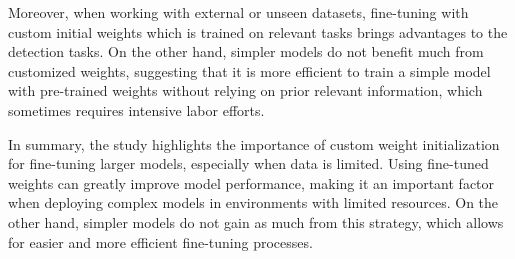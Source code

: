 Moreover, when working with external or unseen datasets, fine-tuning with custom initial weights which is trained on relevant tasks brings advantages to the detection tasks.  On the other hand, simpler models do not benefit much from customized weights, suggesting that it is more efficient to train a simple model with pre-trained weights without relying on prior relevant information, which sometimes requires intensive labor efforts.

In summary, the study highlights the importance of custom weight initialization for fine-tuning larger models, especially when data is limited. Using fine-tuned weights can greatly improve model performance, making it an important factor when deploying complex models in environments with limited resources. On the other hand, simpler models do not gain as much from this strategy, which allows for easier and more efficient fine-tuning processes.






